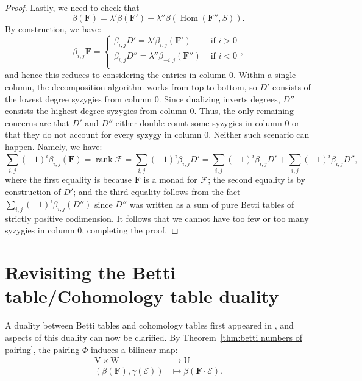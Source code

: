 \documentclass[12pt]{amsart}
\theoremstyle{definition}
\theoremstyle{remark}
\newcommand{\Hom}{\operatorname{Hom}} %
\newcommand{\rank}{\operatorname{rank}}
\newcommand{\UU}{\mathrm{U}}
\newcommand{\VV}{\mathrm{V}}
\newcommand{\WW}{\mathrm{W}}
\newcommand{\cE}{\mathcal{E}}
\newcommand{\cF}{\mathcal{F}}
\newcommand{\FF}{\mathbf{F}}
\begin{document}
\begin{proof}
Lastly, we need to check that
\[
\beta(\FF)=\lambda'\beta(\FF')+\lambda''\beta(\Hom(\FF'',S)).
\]
By construction, we have:
\[
\beta_{i,j}\FF=\begin{cases}
\beta_{i,j}D'=\lambda'\beta_{i,j}(\FF') &\text{ if } i>0\\
\beta_{i,j}D''=\lambda''\beta_{-i,j}(\FF'') &\text{ if } i<0\\
\end{cases},
\]
and hence this reduces to considering the entries in column $0$.  Within a single column, the decomposition algorithm works from top to bottom, so $D'$ consists of the lowest degree syzygies from column $0$.  Since dualizing inverts degrees, $D''$ consists the highest degree syzygies from column $0$.  Thus, the only remaining concerns are that $D'$ and $D''$ either double count some syzygies in column $0$ or that they do not account for every syzygy in column $0$.  Neither such scenario can happen.  Namely, we have:
\[
\sum_{i,j} (-1)^i \beta_{i,j}(\FF)=\rank \cF=\sum_{i,j} (-1)^i\beta_{i,j}D'=\sum_{i,j} (-1)^i\beta_{i,j}D'+\sum_{i,j} (-1)^i\beta_{i,j}D'',
\]
where the first equality is because $\FF$ is a monad for $\cF$; the second equality is by construction of $D'$; and the third equality follows from the fact $\sum_{i,j}(-1)^i\beta_{i,j}(D'')$ since $D''$ was written as a sum of pure Betti tables of strictly positive codimension.  It follows that we cannot have too few or too many syzygies in column $0$, completing the proof.
\end{proof}








\section{Revisiting the Betti table/Cohomology table duality}\label{sec:duality}
A duality between Betti tables and cohomology tables first appeared in \cite{eis-schrey1}, and aspects of this duality
can now be clarified. By Theorem~\ref{thm:betti numbers of pairing}, the pairing $\Phi$ induces a bilinear map:
\begin{align*}
\VV\times \WW & \to \UU\\
(\beta(\FF),\gamma(\cE))&\mapsto \beta(\FF\cdot \cE).
\end{align*}
\end{document}
